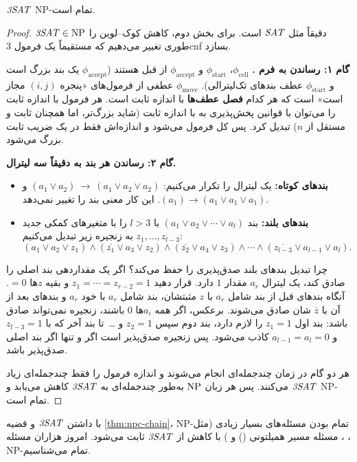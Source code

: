 \begin{theorem}
$\mathit{3SAT}$ NP-تمام است.
\end{theorem}
\begin{proof}
$\mathit{3SAT}\in\mathrm{NP}$ دقیقاً مثل $\mathit{SAT}$ است. برای بخش دوم، کاهش کوک–لوین را طوری تغییر می‌دهیم که مستقیماً یک فرمول 3cnf بسازد.

\textbf{گام ۱: رساندن به فرم .} $\phi_{\mathrm{cell}}$، $\phi_{\mathrm{start}}$ و $\phi_{\mathrm{accept}}$ از قبل  هستند ($\phi_{\mathrm{accept}}$ یک بند بزرگ است و $\phi_{\mathrm{start}}$ عطف بندهای تک‌لیترالی). $\phi_{\mathrm{move}}$ عطفی از فرمول‌های «پنجره $(i,j)$ مجاز است» است که هر کدام \textbf{فصل عطف‌ها} با اندازه ثابت است. هر فرمول با اندازه ثابت را می‌توان با قوانین پخش‌پذیری به  با اندازه ثابت (شاید بزرگ‌تر، اما همچنان ثابت و مستقل از $n$) تبدیل کرد. پس کل فرمول  می‌شود و اندازه‌اش فقط در یک ضریب ثابت بزرگ می‌شود.

\textbf{گام ۲: رساندن هر بند به دقیقاً سه لیترال.}
\begin{itemize}
\item \textbf{بندهای کوتاه:} یک لیترال را تکرار می‌کنیم: $(a_1\vee a_2)\ \to\ (a_1\vee a_2\vee a_2)$ و $(a_1)\to(a_1\vee a_1\vee a_1)$. این کار معنی بند را تغییر نمی‌دهد.
\item \textbf{بندهای بلند:} بند $(a_1\vee a_2\vee\cdots\vee a_l)$ با $l>3$ را با متغیرهای کمکی جدید $z_1,\dots,z_{l-3}$ به زنجیره زیر تبدیل می‌کنیم:
\[(a_1\vee a_2\vee z_1)\wedge(\overline{z_1}\vee a_3\vee z_2)\wedge(\overline{z_2}\vee a_4\vee z_3)\wedge\cdots\wedge(\overline{z_{l-3}}\vee a_{l-1}\vee a_l).\]
\end{itemize}
چرا تبدیل بندهای بلند صدق‌پذیری را حفظ می‌کند؟ اگر یک مقداردهی بند اصلی را صادق کند، یک لیترال $a_r$ مقدار $1$ دارد. قرار دهید $z_1=\cdots=z_{r-2}=1$ و بقیه $z$ها $=0$. آنگاه بندهای قبل از بند شامل $a_r$ با $z$ مثبتشان، بند شامل $a_r$ با خود $a_r$ و بندهای بعد از آن با $\overline{z}$ شان صادق می‌شوند. برعکس، اگر همه $a_i$ها $0$ باشند، زنجیره نمی‌تواند صادق باشد: بند اول $z_1=1$ را لازم دارد، بند دوم سپس $z_2=1$ و \dots\ تا بند آخر که با $z_{l-3}=1$ و $a_{l-1}=a_l=0$ کاذب می‌شود. پس زنجیره صدق‌پذیر است اگر و تنها اگر بند اصلی صدق‌پذیر باشد.

هر دو گام در زمان چندجمله‌ای انجام می‌شوند و اندازه فرمول را فقط چندجمله‌ای زیاد می‌کنند. پس هر زبان $\mathrm{NP}$ به‌طور چندجمله‌ای به $\mathit{3SAT}$ کاهش می‌یابد و $\mathit{3SAT}$ NP-تمام است.
\end{proof}

\begin{note}
با داشتن $\mathit{3SAT}$ و قضیه \ref{thm:npc-chain}، NP-تمام بودن مسئله‌های بسیار زیادی (مثل ، ، مسئله مسیر همیلتونی () و ) با کاهش از $\mathit{3SAT}$ ثابت می‌شود. امروز هزاران مسئله NP-تمام می‌شناسیم.
\end{note}

